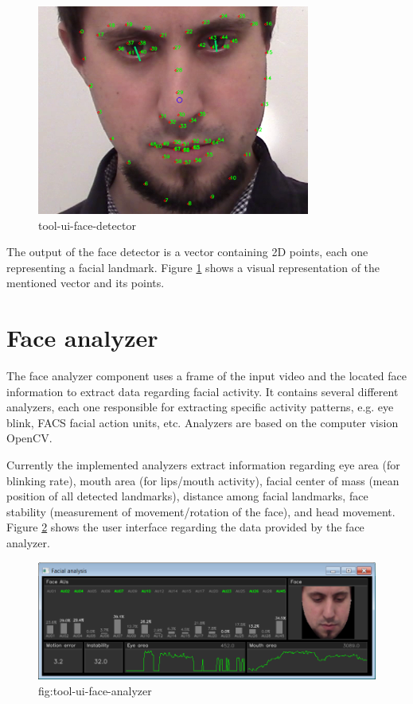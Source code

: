 \begin{figure}[h]
    \centering
    \includegraphics[width=0.8\textwidth]{figures/tool-ui-face-detector.png}
    \caption{tool-ui-face-detector}
    \label{fig:tool-ui-face-detector}
\end{figure}

The output of the face detector is a vector containing 2D points, each one representing a facial landmark. Figure \ref{fig:tool-ui-face-detector} shows a visual representation of the mentioned vector and its points.

\section{Face analyzer}

The face analyzer component uses a frame of the input video and the located face information to extract data regarding facial activity. It contains several different analyzers, each one responsible for extracting specific activity patterns, e.g. eye blink, FACS facial action units, etc. Analyzers are based on the computer vision OpenCV.

Currently the implemented analyzers extract information regarding eye area (for blinking rate), mouth area (for lips/mouth activity), facial center of mass (mean position of all detected landmarks), distance among facial landmarks, face stability (measurement of movement/rotation of the face), and head movement. Figure \ref{fig:tool-ui-face-analyzer} shows the user interface regarding the data provided by the face analyzer.

\begin{figure}[h]
    \centering
    \includegraphics[width=\textwidth]{figures/tool-ui-face-analyzer.png}
    \caption{fig:tool-ui-face-analyzer}
    \label{fig:tool-ui-face-analyzer}
\end{figure}


